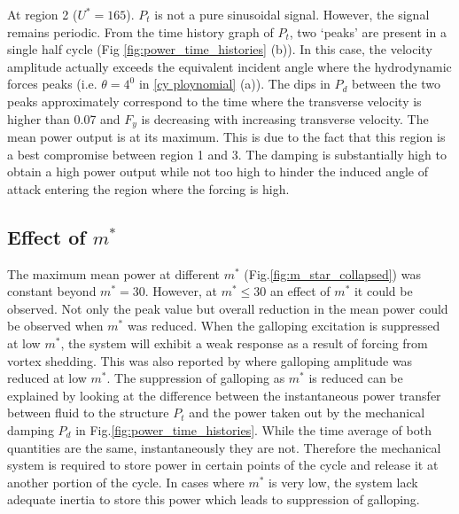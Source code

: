 At region 2 ($U^*=165$). $P_t$ is not a pure sinusoidal signal. However, the  signal remains periodic. From the time history graph of $P_t$, two `peaks' are present in a single half cycle (Fig \ref{fig:power_time_histories} (b)). In this case, the velocity amplitude actually exceeds the equivalent incident angle where the hydrodynamic forces peaks (i.e. $\theta=4^0$ in \ref{cy ploynomial} (a)). The dips in $P_d$ between the two peaks approximately correspond to the time where the transverse velocity is higher than 0.07 and $F_y$ is decreasing with increasing transverse velocity. The mean power output is at its maximum. This is due to the fact that this region is a best compromise between region 1 and 3. The damping is substantially high to obtain a high power output while not too high to hinder the induced angle of attack entering the region where the forcing is high. 


 
  

 



\subsection{Effect of $m^*$}

 

The maximum mean power at different $m^*$ (Fig.\ref{fig:m_star_collapsed}) was constant beyond $m^*=30$. However, at $m^* \leq 30$ an effect of $m^*$ it could be observed. Not only the peak value but overall reduction in the mean power could be observed when $m^*$ was reduced. When the galloping excitation is suppressed at low $m^*$, the system will exhibit a weak response as a result of forcing from vortex shedding. This was also reported by \cite{Joly2012} where galloping amplitude was reduced at low $m^*$. The suppression of galloping as $m^*$ is reduced can be explained by looking at the difference between the instantaneous power transfer between fluid to the structure $P_t$ and the power taken out by the mechanical damping $P_d$ in Fig.\ref{fig:power_time_histories}. While the time average of both quantities are the same, instantaneously they are not. Therefore the mechanical system is required to store power in certain points of the cycle and release it at another portion of the cycle. In cases where $m^*$ is very low, the system lack adequate inertia to store this power which leads to suppression of galloping. 

 

